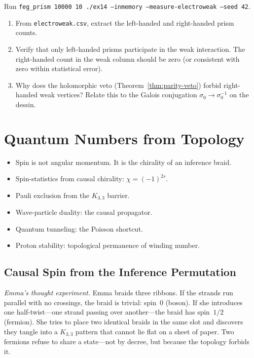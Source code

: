 \documentclass[11pt, a4paper, openany]{book}
\newcounter{thm}[chapter]
\newenvironment{introduction}[1][Modulo Overview]{%
  \begin{tcolorbox}[
    enhanced,colback=structure!5,colframe=structure,
    colbacktitle=structure,coltitle=white,
    fonttitle=\small\bfseries,title={#1},
    arc=2pt,boxrule=0.7pt,
    left=8pt,right=8pt,top=6pt,bottom=6pt,
    before skip=12pt,after skip=12pt
  ]\itshape\begin{itemize}[leftmargin=*,itemsep=2pt,parsep=0pt]
}{%
  \end{itemize}\end{tcolorbox}
}
\begin{document}
\begin{simulation}
Run \texttt{feg\_prism 10000 10 ./ex14 --inmemory --measure-electroweak --seed 42}.
\begin{enumerate}
\item From \texttt{electroweak.csv}, extract the left-handed and right-handed prism counts.
\item Verify that only left-handed prisms participate in the weak interaction. The right-handed count in the weak column should be zero (or consistent with zero within statistical error).
\item Why does the holomorphic veto (Theorem~\ref{thm:parity-veto}) forbid right-handed weak vertices? Relate this to the Galois conjugation $\sigma_0 \to \sigma_0^{-1}$ on the dessin.
\end{enumerate}
\end{simulation}


\chapter{Quantum Numbers from Topology}\label{ch:quantum-numbers}

\begin{introduction}
  \item Spin is not angular momentum. It is the chirality of an inference braid.
  \item Spin-statistics from causal chirality: $\chi = (-1)^{2s}$.
  \item Pauli exclusion from the $K_{3,3}$ barrier.
  \item Wave-particle duality: the causal propagator.
  \item Quantum tunneling: the Poisson shortcut.
  \item Proton stability: topological permanence of winding number.
\end{introduction}

\section{Causal Spin from the Inference Permutation}\label{sec:spin}

\smallskip\noindent
\textit{Emma's thought experiment.}
Emma braids three ribbons. If the strands run parallel with no
crossings, the braid is trivial: spin~0 (boson). If she introduces one
half-twist---one strand passing over another---the braid has spin~$1/2$
(fermion). She tries to place two identical braids in the same slot and
discovers they tangle into a $K_{3,3}$ pattern that cannot lie flat on a
sheet of paper. Two fermions refuse to share a state---not by decree,
but because the topology forbids it.
\smallskip
\end{document}
